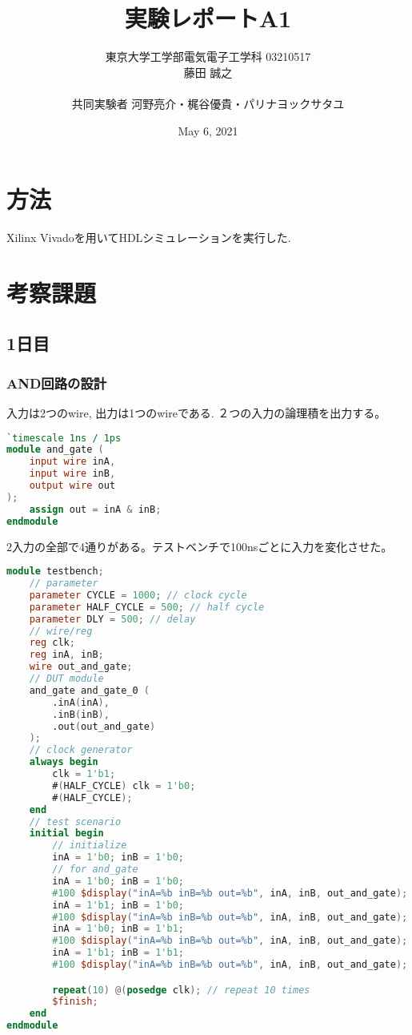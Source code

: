 \documentclass[titlepage]{ltjsarticle}
\title{実験レポートA1}
\author{東京大学工学部電気電子工学科 03210517\\藤田 誠之\\~\\ 共同実験者  河野亮介・梶谷優貴・パリナヨックサタユ}
\date{May 6, 2021}
\begin{document}
\maketitle
\newpage

\section{方法}
Xilinx Vivadoを用いてHDLシミュレーションを実行した.
\section{考察課題}
\subsection{1日目}
\subsubsection{AND回路の設計}

入力は2つのwire, 出力は1つのwireである. ２つの入力の論理積を出力する。
\begin{lstlisting}[caption=AND回路デザイン,language=verilog]
`timescale 1ns / 1ps
module and_gate (
    input wire inA,
    input wire inB,
    output wire out
);
    assign out = inA & inB;
endmodule
\end{lstlisting}
2入力の全部で4通りがある。テストベンチで100nsごとに入力を変化させた。
\begin{lstlisting}[caption=AND回路テストベンチ,language=verilog]
    module testbench;
    // parameter
    parameter CYCLE = 1000; // clock cycle
    parameter HALF_CYCLE = 500; // half cycle
    parameter DLY = 500; // delay
    // wire/reg
    reg clk;
    reg inA, inB;
    wire out_and_gate;
    // DUT module
    and_gate and_gate_0 (
        .inA(inA),
        .inB(inB),
        .out(out_and_gate)
    );
    // clock generator
    always begin
        clk = 1'b1;
        #(HALF_CYCLE) clk = 1'b0;
        #(HALF_CYCLE);
    end
    // test scenario
    initial begin
        // initialize
        inA = 1'b0; inB = 1'b0; 
        // for and_gate
        inA = 1'b0; inB = 1'b0;
        #100 $display("inA=%b inB=%b out=%b", inA, inB, out_and_gate);
        inA = 1'b1; inB = 1'b0;
        #100 $display("inA=%b inB=%b out=%b", inA, inB, out_and_gate);  
        inA = 1'b0; inB = 1'b1;
        #100 $display("inA=%b inB=%b out=%b", inA, inB, out_and_gate);  
        inA = 1'b1; inB = 1'b1;
        #100 $display("inA=%b inB=%b out=%b", inA, inB, out_and_gate);

        repeat(10) @(posedge clk); // repeat 10 times
        $finish;
    end
endmodule
\end{lstlisting}
\end{document}
